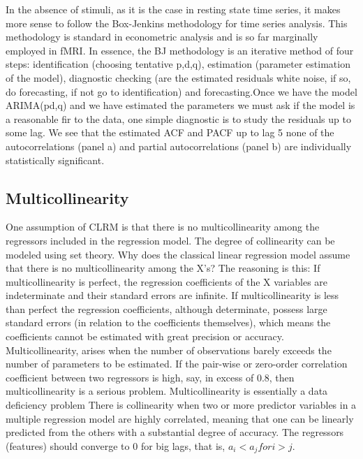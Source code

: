 \documentclass[10pt,letterpaper]{article}
\begin{document}
In the absence of stimuli, as it is the case in resting state time series, it makes more sense to follow the Box-Jenkins methodology for time series analysis. 
This methodology is standard in econometric analysis and is so far marginally employed in fMRI.  
In essence, the BJ methodology is an iterative method of four steps: identification (choosing tentative p,d,q), estimation (parameter estimation of the model), diagnostic checking (are the estimated residuals white noise, if so, do forecasting, if not go to identification) and forecasting.Once we have the model ARIMA(pd,q) and we have estimated the parameters we must ask if the model is a reasonable fir to the data, one simple diagnostic is to study the residuals up to some lag. We see that the estimated ACF and PACF up to lag 5 none of the autocorrelations (panel a) and partial autocorrelations (panel b) are individually statistically significant.

\subsection{Multicollinearity}
One assumption of CLRM is that there is no multicollinearity among the regressors included in the regression model. The degree of collinearity can be modeled using set theory.
Why does the classical linear regression model assume that there is no multicollinearity among the X’s? The reasoning is this: If multicollinearity is perfect, the regression coefficients of the X variables are indeterminate and their standard errors are infinite. If multicollinearity is less than perfect the regression coefficients, although determinate, possess large standard errors (in relation to the coefficients themselves), which means the coefficients cannot be estimated with great precision or accuracy.
Multicollinearity, arises when the number of observations barely exceeds the number of parameters to be estimated. If the pair-wise or zero-order correlation coefficient between two regressors is high, say, in excess of 0.8, then multicollinearity is a serious problem. 
Multicollinearity is essentially a data deficiency problem 
There is collinearity when two or more predictor variables in a multiple regression model are highly correlated, meaning that one can be linearly predicted from the others with a substantial degree of accuracy. The regressors (features) should converge to 0 for big lags, that is, $a_{i} < a_{j} for i > j$.
\end{document}
